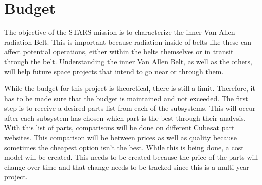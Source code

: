 
\section{Budget}
The objective of the STARS mission is to characterize the inner Van Allen radiation Belt. This is important because radiation inside of belts like these can affect potential operations, either within the belts themselves or in transit through the belt. Understanding the inner Van Allen Belt, as well as the others, will help future space projects that intend to go near or through them.

While the budget for this project is theoretical, there is still a limit. Therefore, it has to be made sure that the budget is maintained and not exceeded. The first step is to receive a desired parts list from each of the subsystems. This will occur after each subsystem has chosen which part is the best through their analysis. With this list of parts, comparisons will be done on different Cubesat part websites. This comparison will be between prices as well as quality because sometimes the cheapest option isn't the best. While this is being done, a cost model will be created. This needs to be created because the price of the parts will change over time and that change needs to be tracked since this is a multi-year project. 